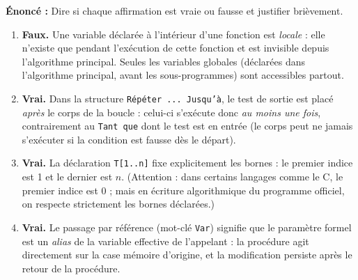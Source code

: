 \documentclass[11pt]{article}
\newcommand{\cle}[1]{{\popxbold\color{popdark}#1}}
\begin{document}
\begin{corrige}
\textbf{Énoncé :} Dire si chaque affirmation est vraie ou fausse et justifier brièvement.
\tcblower
\begin{enumerate}
  \item \textbf{Faux.} Une variable déclarée à l'intérieur d'une fonction est \emph{locale} : elle n'existe que pendant l'exécution de cette fonction et est invisible depuis l'algorithme principal. Seules les \cle{variables globales} (déclarées dans l'algorithme principal, avant les sous-programmes) sont accessibles partout.
  \item \textbf{Vrai.} Dans la structure \texttt{Répéter ... Jusqu'à}, le test de sortie est placé \emph{après} le corps de la boucle : celui-ci s'exécute donc \emph{au moins une fois}, contrairement au \texttt{Tant que} dont le test est en entrée (le corps peut ne jamais s'exécuter si la condition est fausse dès le départ).
  \item \textbf{Vrai.} La déclaration \texttt{T[1..n]} fixe explicitement les bornes : le premier indice est 1 et le dernier est $n$. (Attention : dans certains langages comme le C, le premier indice est 0 ; mais en écriture algorithmique du programme officiel, on respecte strictement les bornes déclarées.)
  \item \textbf{Vrai.} Le \cle{passage par référence} (mot-clé \texttt{Var}) signifie que le paramètre formel est un \emph{alias} de la variable effective de l'appelant : la procédure agit directement sur la case mémoire d'origine, et la modification persiste après le retour de la procédure.
\end{enumerate}
\end{corrige}
\end{document}

